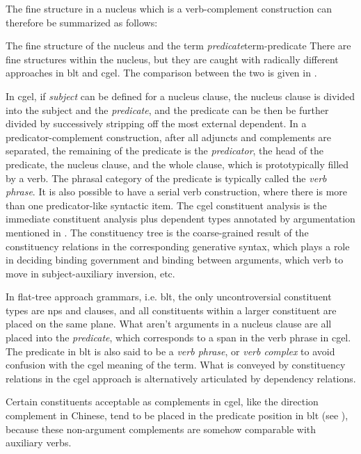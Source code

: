 \documentclass[UTF8, a4paper, oneside, scheme=plain]{ctexart}
\newcommand*{\term}[1]{\emph{#1}}
\begin{document}
The fine structure in a nucleus which is a verb-complement construction can therefore be summarized as follows:
\begin{infobox}{The fine structure of the nucleus and the term \term{predicate}}{term-predicate}
    There are fine structures within the nucleus,
    but they are caught with radically different approaches in \ac{blt} and \ac{cgel}.
    The comparison between the two is given in .

    In \ac{cgel}, if \term{subject} can be defined for a nucleus clause,  
    the nucleus clause is divided into the subject and the \term{predicate},
    and the predicate can be then be further divided 
    by successively stripping off the most external dependent.
    In a predicator-complement construction,
    after all adjuncts and complements are separated, 
    the remaining of the predicate is the \term{predicator},
    the head of the predicate, the nucleus clause, and the whole clause,
    which is prototypically filled by a verb.
    The phrasal category of the predicate is typically called the \term{verb phrase}.
    It is also possible to have a serial verb construction,
    where there is more than one predicator-like syntactic item.
    The \ac{cgel} constituent analysis is the immediate constituent analysis 
    plus dependent types annotated by argumentation mentioned in .
    The constituency tree is the coarse-grained result 
    of the constituency relations in the corresponding generative syntax,
    which plays a role in deciding binding government and binding between arguments, 
    which verb to move in subject-auxiliary inversion, etc.

    In flat-tree approach grammars, i.e. \ac{blt}, 
    the only uncontroversial constituent types are \ac{np}s and clauses,
    and all constituents within a larger constituent are placed on the same plane.
    What aren't arguments in a nucleus clause 
    are all placed into the \term{predicate},
    which corresponds to a span in the verb phrase in \ac{cgel}. 
    The predicate in \ac{blt} is also said to be a \term{verb phrase},
    or \term{verb complex} to avoid confusion with the \ac{cgel} meaning of the term.
    What is conveyed by constituency relations in the \ac{cgel} approach
    is alternatively articulated by dependency relations.

    Certain constituents acceptable as complements in \ac{cgel}, 
    like the direction complement in Chinese, 
    tend to be placed in the predicate position in \ac{blt} (see ),
    because these non-argument complements are somehow comparable with auxiliary verbs.


\end{infobox}
\end{document}
